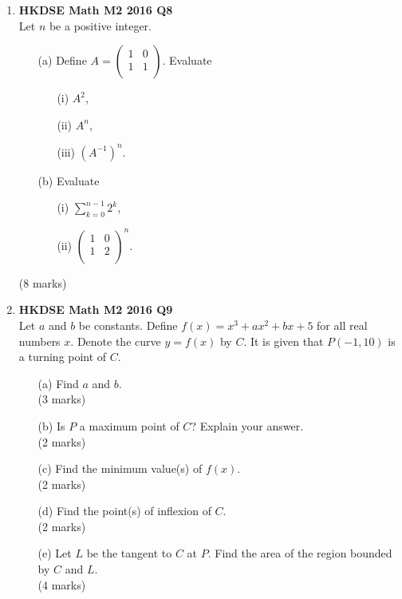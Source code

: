 \documentclass[12pt]{article}
\begin{document}
\begin{enumerate}
	\item \textbf{HKDSE Math M2 2016 Q8}\\
	Let $n$ be a positive integer.
	\begin{enumerate}
		\item [(a)]Define $A = 
		\begin{pmatrix}
			1&0\\1&1\\
		\end{pmatrix}$. Evaluate 
		\begin{enumerate}
			\item [(i)]$A^2$, 
			\item [(ii)]$A^n$,
			\item [(iii)]$(A^{-1})^n$.
		\end{enumerate}
		\item [(b)]Evaluate
		\begin{enumerate}
			\item [(i)]$\displaystyle\sum_{k=0}^{n-1} 2^k$,
			\item [(ii)]$\begin{pmatrix}
				1&0\\1&2\\
			\end{pmatrix} ^n$.
		\end{enumerate}
	\end{enumerate}
	(8 marks)

	\item \textbf{HKDSE Math M2 2016 Q9}\\
	Let $a$ and $b$ be constants. Define $f(x) = x^3 + ax^2 + bx + 5$ for all real numbers $x$. Denote the curve $y = f(x)$ by $C$. It is given that $P(-1,10)$ is a turning point of $C$.
	\begin{enumerate}
		\item [(a)]Find $a$ and $b$.\\(3 marks)
		\item [(b)]Is $P$ a maximum point of $C$? Explain your answer. \\(2 marks)
		\item [(c)]Find the minimum value(s) of $f(x)$. \\(2 marks)
		\item [(d)]Find the point(s) of inflexion of $C$. \\(2 marks)
		\item [(e)]Let $L$ be the tangent to $C$ at $P$. Find the area of the region bounded by $C$ and $L$. \\(4 marks)
	\end{enumerate}


\end{enumerate}
\end{document}
